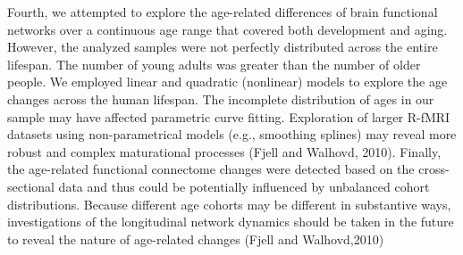 Fourth, we attempted to explore
the age-related differences of brain functional networks
over a continuous age range that covered both development and aging. 
However, the analyzed samples were
not perfectly distributed across the entire lifespan. The
number of young adults was greater than the number of
older people. We employed linear and quadratic (nonlinear) models to explore 
the age changes across the human
lifespan. The incomplete distribution of ages in our sample may have 
affected parametric curve fitting. Exploration
of larger R-fMRI datasets using non-parametrical models
(e.g., smoothing splines) may reveal more robust and complex maturational 
processes (Fjell and Walhovd, 2010).
Finally, the age-related functional connectome changes
were detected based on the cross-sectional data and thus
could be potentially influenced by unbalanced cohort distributions. 
Because different age cohorts may be different
in substantive ways, investigations of the longitudinal network dynamics 
should be taken in the future to reveal
the nature of age-related changes (Fjell and Walhovd,2010)

\cite{Cao2014}

